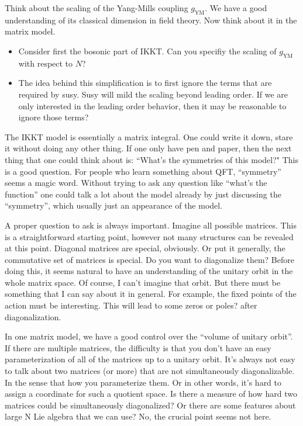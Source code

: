 
\begin{todo}
	Think about the scaling of the Yang-Mills coupling $g_{\text{YM}}$.	
	We have a good understanding of its classical dimension in field theory.
	Now think about it in the matrix model.
	\begin{itemize}
		\item Consider first the bosonic part of IKKT.
			Can you specifiy the scaling of $g_{\text{YM}}$ with respect to $N$?
		\item The idea behind this simplification is 
			to first ignore the terms that are required by susy. 
			Susy will mild the scaling beyond leading order.
			If we are only interested in the leading order behavior,
			then it may be reasonable to ignore those terms?
	\end{itemize}
\end{todo}

The IKKT model is essentially a matrix integral.
One could write it down, stare it without doing any other thing.
If one only have pen and paper, then the next thing that one could think about is: ``What's the symmetries of this model?"
This is a good question.
For people who learn something about QFT, ``symmetry'' seems a magic word.
Without trying to ask any question like ``what's the function''
one could talk a lot about the model already by just discussing the ``symmetry'', which usually just an appearance of the model.

A proper question to ask is always important.
Imagine all possible matrices.
This is a straightforward starting point, however not many structures can be revealed at this point.
Diagonal matrices are special, obviously.
Or put it generally, the commutative set of matrices is special.
Do you want to diagonalize them?
Before doing this, it seems natural to have an understanding of the unitary orbit in the whole matrix space.
Of course, I can't imagine that orbit.
But there must be something that I can say about it in general.
For example, the fixed points of the action must be interesting.
This will lead to some zeros or poles? after diagonalization.

In one matrix model, we have a good control over the ``volume of unitary orbit''.
If there are multiple matrices, the difficulty is that
you don't have an easy parameterization of all of the matrices up to a unitary orbit.
It's always not easy to talk about two matrices (or more) that are not simultaneously diagonalizable.
In the sense that how you parameterize them.
Or in other words, it's hard to assign a coordinate for such a quotient space.
Is there a measure of how hard two matrices could be simultaneously diagonalized?
Or there are some features about large N Lie algebra that we can use?
No, the crucial point seems not here.

